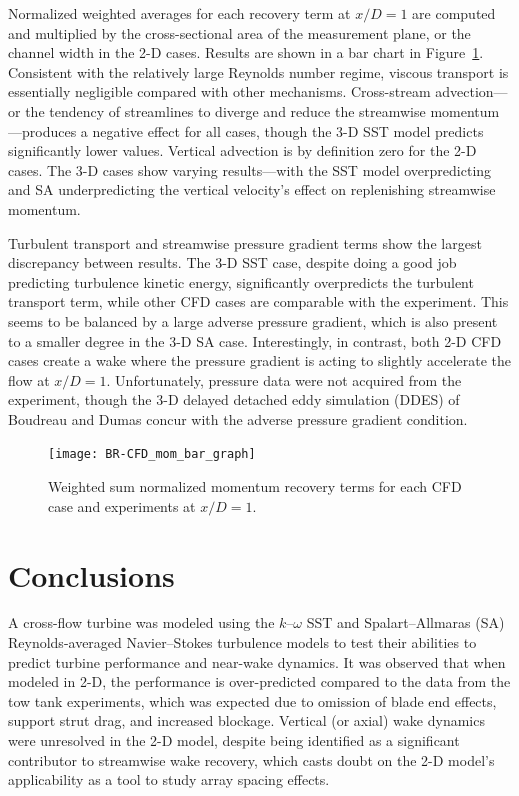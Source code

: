 \documentclass[aip,graphicx]{revtex4-1}
\begin{document}
Normalized weighted averages for each recovery term at $x/D=1$ are computed and
multiplied by the cross-sectional area of the measurement plane, or the channel
width in the 2-D cases. Results are shown in a bar chart in
Figure~\ref{fig:br-cfd-recovery}. Consistent with the relatively large Reynolds
number regime, viscous transport is essentially negligible compared with other
mechanisms. Cross-stream advection---or the tendency of streamlines to diverge
and reduce the streamwise momentum---produces a negative effect for all cases,
though the 3-D SST model predicts significantly lower values. Vertical advection
is by definition zero for the 2-D cases. The 3-D cases show varying
results---with the SST model overpredicting and SA underpredicting the vertical
velocity's effect on replenishing streamwise momentum.

Turbulent transport and streamwise pressure gradient terms show the largest
discrepancy between results. The 3-D SST case, despite doing a good job
predicting turbulence kinetic energy, significantly overpredicts the turbulent
transport term, while other CFD cases are comparable with the experiment. This
seems to be balanced by a large adverse pressure gradient, which is also present
to a smaller degree in the 3-D SA case. Interestingly, in contrast, both 2-D CFD
cases create a wake where the pressure gradient is acting to slightly accelerate
the flow at $x/D=1$. Unfortunately, pressure data were not acquired from the
experiment, though the 3-D delayed detached eddy simulation (DDES) of Boudreau
and Dumas \cite{Boudreau2015} concur with the adverse pressure gradient
condition.

\begin{figure}
    \centering
    
    \texttt{[image: BR-CFD\_mom\_bar\_graph]}
    
    \caption{Weighted sum normalized momentum recovery terms for each CFD case
        and experiments\cite{Bachant2016-RVAT-Re-dep} at $x/D=1$.}
    
    \label{fig:br-cfd-recovery}
\end{figure}


\section{Conclusions}

A cross-flow turbine was modeled using the $k$--$\omega$ SST and
Spalart--Allmaras (SA) Reynolds-averaged Navier--Stokes turbulence models to test
their abilities to predict turbine performance and near-wake dynamics. It was
observed that when modeled in 2-D, the performance is over-predicted compared to
the data from the tow tank experiments, which was expected due to omission of
blade end effects, support strut drag, and increased blockage. Vertical (or
axial) wake dynamics were unresolved in the 2-D model, despite being identified
as a significant contributor to streamwise wake recovery, which casts doubt on
the 2-D model's applicability as a tool to study array spacing effects.
\end{document}
